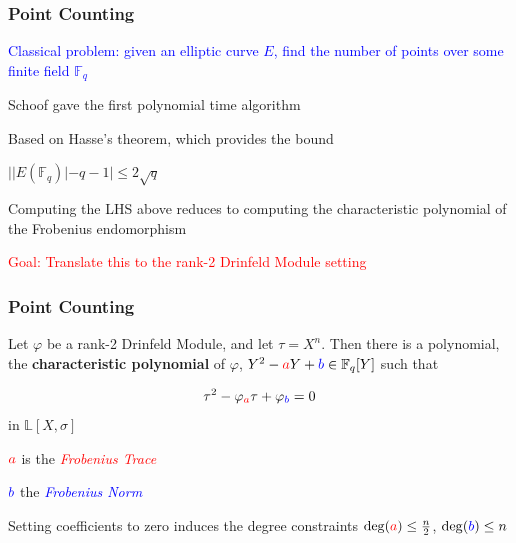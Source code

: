 \documentclass{beamer}
\newcommand{\blue}{\textcolor{blue}}
\newcommand{\red}{\textcolor{red}}
\newcommand{\spa}{\vspace{0.2cm}}
\begin{document}
\begin{frame}
\frametitle{Point Counting}


 \blue{Classical problem: given an elliptic curve $E$, find the number of points over some finite field $\mathbb{F}_q$} 
 
 \spa
 
Schoof gave the first polynomial time algorithm

\spa

Based on Hasse's theorem, which provides the bound 

\centerline {$ | |E(\mathbb{F}_q)| - q - 1  | \leq 2 \sqrt{q} $}

\spa

 Computing the LHS above reduces to computing the characteristic polynomial of the Frobenius endomorphism
 
 \spa
\red{Goal: Translate this to the rank-2 Drinfeld Module setting}


\end{frame}









\begin{frame}
\frametitle{Point Counting}

\begin{theorem}[Gekeler, 1991]
Let $\varphi$ be a rank-2 Drinfeld Module, and let $\tau = X^n$. Then there is a polynomial, the \textbf{characteristic polynomial} of $\varphi$,  $Y^2 - \red{a}Y +\blue{b} \in \mathbb{F}_q[Y]$ such that

\[\tau^2 -\varphi_{\red{a}}\tau + \varphi_{\blue{b}} = 0\]
in $\mathbb{L}[X,\sigma]$
\end{theorem}

\spa

$\red{a}$ is the \red{\textit{Frobenius Trace}}

\spa

$\blue{b}$ the \blue{\textit{Frobenius Norm}}

\spa

Setting coefficients to zero induces the degree constraints $\deg(\red{a}) \leq \frac{n}{2}$, $\deg(\blue{b}) \leq n$


\end{frame}
\end{document}
